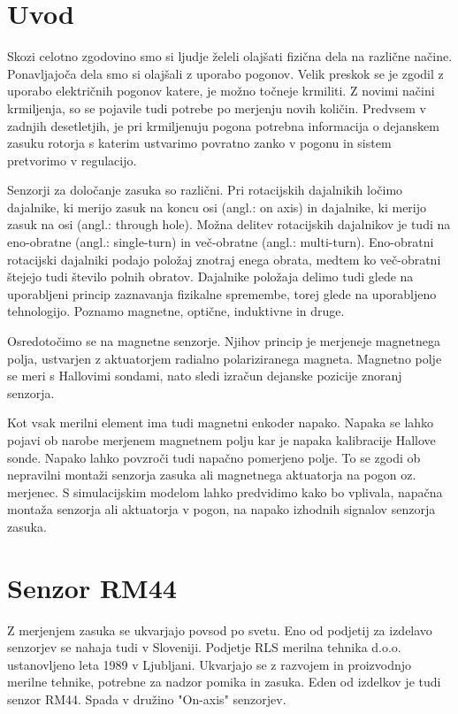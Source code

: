 \chapter{Uvod} \label{uvod}

Skozi celotno zgodovino smo si ljudje želeli olajšati fizična dela na različne načine. Ponavljajoča dela smo si olajšali z uporabo pogonov. Velik preskok se je zgodil z uporabo električnih pogonov katere, je možno točneje krmiliti. Z novimi načini krmiljenja, so se pojavile tudi potrebe po merjenju novih količin. Predvsem v zadnjih desetletjih, je pri krmiljenuju pogona potrebna informacija o dejanskem zasuku rotorja s katerim ustvarimo povratno zanko v pogonu in sistem pretvorimo v regulacijo.

Senzorji za določanje zasuka so različni. Pri rotacijskih dajalnikih ločimo dajalnike, ki merijo zasuk na koncu osi (angl.: on axis) in dajalnike, ki merijo zasuk na osi (angl.: through hole). Možna
delitev rotacijskih dajalnikov je tudi na eno-obratne (angl.: single-turn) in več-obratne
(angl.: multi-turn). Eno-obratni rotacijski dajalniki podajo položaj znotraj enega
obrata, medtem ko več-obratni štejejo tudi število polnih obratov.
Dajalnike položaja delimo tudi glede na uporabljeni princip zaznavanja fizikalne
spremembe, torej glede na uporabljeno tehnologijo. Poznamo magnetne, optične,
induktivne in druge\cite{killer}.

Osredotočimo se na magnetne senzorje. Njihov princip je merjeneje magnetnega polja, ustvarjen z aktuatorjem radialno polariziranega magneta. Magnetno polje se meri s Hallovimi sondami, nato sledi izračun dejanske pozicije znoranj senzorja.

Kot vsak merilni element ima tudi magnetni enkoder napako. Napaka se lahko pojavi ob narobe merjenem magnetnem polju kar je napaka kalibracije Hallove sonde. Napako lahko povzroči tudi napačno pomerjeno polje. To se zgodi ob nepravilni montaži senzorja zasuka ali magnetnega aktuatorja na pogon oz. merjenec. S simulacijskim modelom lahko predvidimo kako bo vplivala, napačna montaža senzorja ali aktuatorja v pogon, na napako izhodnih signalov senzorja zasuka.

\chapter{Senzor RM44}

Z merjenjem zasuka se ukvarjajo povsod po svetu. Eno od podjetij za izdelavo senzorjev se nahaja tudi v Sloveniji. Podjetje RLS merilna tehnika d.o.o. ustanovljeno leta 1989 v Ljubljani. Ukvarjajo se z razvojem in proizvodnjo merilne tehnike, potrebne za nadzor pomika in zasuka. Eden od izdelkov je tudi senzor RM44. Spada v družino "On-axis" senzorjev.

